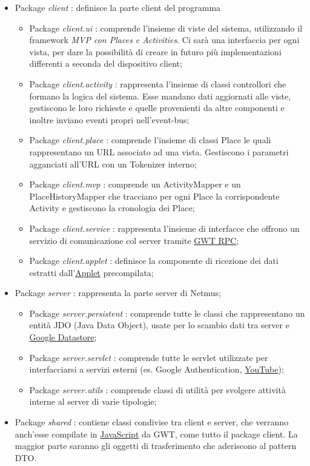 \begin{itemize}
  \item Package \emph{client} : definisce la parte client del programma
  \begin {itemize}
    \item Package \emph{client.ui} : comprende l'insieme di viste del sistema,
    utilizzando il framework \emph{MVP con Places e Activities}. Ci sar\`a una
    interfaccia per ogni vista, per dare la possibilit\`a di creare in futuro
    pi\`u implementazioni differenti a seconda del dispositivo client;
    \item Package \emph{client.activity} : rappresenta l'insieme di classi
    controllori che formano la logica del sistema. Esse mandano dati aggiornati alle
    viste, gestiscono le loro richieste e quelle provenienti da altre componenti
    e inoltre inviano eventi propri nell'event-bus;
    \item Package \emph{client.place} : comprende l'insieme di classi Place le
    quali rappresentano un URL associato ad una vista. Gestiscono i parametri
    agganciati all'URL con un Tokenizer interno;
    \item Package \emph{client.mvp} : comprende un ActivityMapper e
    un PlaceHistoryMapper che tracciano per ogni Place la corrispondente
    Activity e gestiscono la cronologia dei Place;
    \item Package \emph{client.service} : rappresenta l'insieme di interfacce
    che offrono un servizio di comunicazione col server tramite \underline{GWT
    RPC};
    \item Package \emph{client.applet} : definisce la componente di
    ricezione dei dati estratti dall'\underline{Applet} precompilata;
  \end {itemize}
  \item Package \emph{server} : rappresenta la parte server di Netmus;
  \begin{itemize}
    \item Package \emph{server.persistent} : comprende tutte le classi che
    rappresentano un entit\`a JDO (Java Data Object), usate per lo scambio dati tra
    server e \underline{Google Datastore};
    \item Package \emph{server.servlet} : comprende tutte le servlet utilizzate
    per interfacciarsi a servizi esterni (es. Google Authentication,
    \underline{YouTube});
    \item Package \emph{server.utils} : comprende classi di utilit\`a per
    svolgere attivit\`a interne al server di varie tipologie;
  \end{itemize}
  \item Package \emph{shared} :  contiene classi condivise tra client e server,
  che verranno anch'esse compilate in \underline{JavaScript} da GWT, come tutto
  il package client. La maggior parte saranno gli oggetti di trasferimento che
  aderiscono al pattern DTO.
\end{itemize}


